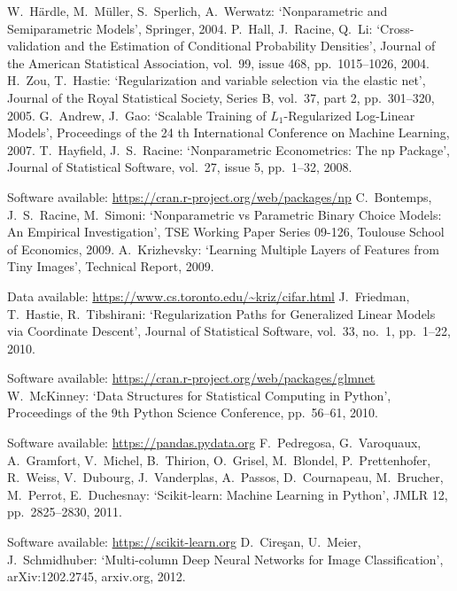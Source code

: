 \begin{thebibliography}{99}
%
W.\ Härdle, M.\ Müller, S.\ Sperlich, A.\ Werwatz: `Nonparametric and Semiparametric Models', Springer, 2004.
%
P.\ Hall, J.\ Racine, Q.\ Li: `Cross-validation and the Estimation of Conditional Probability Densities', Journal of the American Statistical Association, vol.\ 99, issue 468, pp.\ 1015--1026, 2004.
%
H.\ Zou, T.\ Hastie: `Regularization and variable selection via the elastic net', Journal of the Royal Statistical Society, Series B, vol.\ 37, part 2, pp.\ 301--320, 2005.
%
G.\ Andrew, J.\ Gao: `Scalable Training of $L_1$-Regularized Log-Linear Models', Proceedings of the 24 th International Conference on Machine Learning, 2007.
%
T.\ Hayfield, J.\ S.\ Racine: `Nonparametric Econometrics: The np Package', Journal of Statistical Software, vol.\ 27, issue 5, pp.\ 1--32, 2008.\par
%
Software available: \url{https://cran.r-project.org/web/packages/np}
%
C.\ Bontemps, J.\ S.\ Racine, M.\ Simoni: `Nonparametric vs Parametric Binary Choice Models: An Empirical Investigation', TSE Working Paper Series 09-126, Toulouse School of Economics, 2009.
%
A.\ Krizhevsky: `Learning Multiple Layers of Features from Tiny Images', Technical Report, 2009.\par
%
Data available: \url{https://www.cs.toronto.edu/~kriz/cifar.html}
%
J.\ Friedman, T.\ Hastie, R.\ Tibshirani: `Regularization Paths for Generalized Linear Models via Coordinate Descent', Journal of Statistical Software, vol.\ 33, no.\ 1, pp.\ 1--22, 2010.\par
%
Software available: \url{https://cran.r-project.org/web/packages/glmnet}
%
W.\ McKinney: `Data Structures for Statistical Computing in Python', Proceedings of the 9th Python Science Conference, pp.\ 56--61, 2010.\par
%
Software available: \url{https://pandas.pydata.org}
%
F.\ Pedregosa, G.\ Varoquaux, A.\ Gramfort, V.\ Michel, B.\ Thirion, O.\ Grisel, M.\ Blondel, P.\ Prettenhofer, R.\ Weiss, V.\ Dubourg, J.\ Vanderplas, A.\ Passos, D.\ Cournapeau, M.\ Brucher, M.\ Perrot, E.\ Duchesnay: `Scikit-learn: Machine Learning in Python', JMLR 12, pp.\ 2825--2830, 2011.\par
%
Software available: \url{https://scikit-learn.org}
%
D.\ Cire\c{s}an, U.\ Meier, J.\ Schmidhuber: `Multi-column Deep Neural Networks for Image Classification', arXiv:1202.2745, arxiv.org, 2012.

\end{thebibliography}
